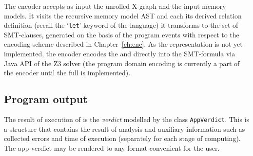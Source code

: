 The \zformula{} encoder accepts as input the unrolled X-graph and the input memory models.
It visits the recursive memory model AST and each its derived relation definition (recall the `\texttt{let}' keyword of the \cat{} language) it transforms to the set of SMT-clauses, generated on the basis of the program events with respect to the encoding scheme described in Chapter~\ref{ch:enc}.
As the \zformula{} representation is not yet implemented, the \zformula{} encoder encodes the \xgraph{} and \wmodel{} directly into the SMT-formula via Java API of the Z3 solver (the program domain encoding is currently a part of the \zformula{} encoder until the full \xgraph[CF+DF] is implemented).


%
%
%


\subsection{Program output}
\label{ch:impl:out}

The result of execution of \porthos[2] is the \textit{verdict} modelled by the class \texttt{AppVerdict}.
This is a structure that contains the result of analysis and auxiliary information such as collected errors and time of execution (separately for each stage of computing).
The app verdict may be rendered to any format convenient for the user.

